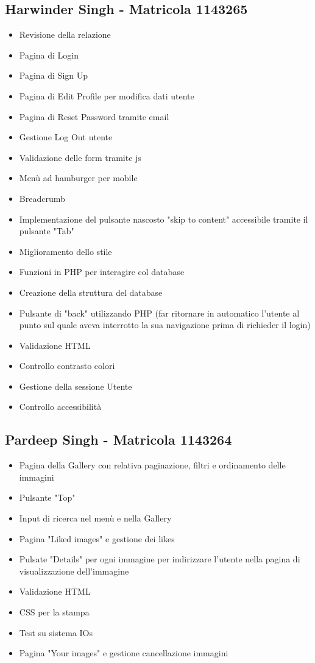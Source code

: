 \documentclass[openany, a4paper, 12pt]{report}
\begin{document}
	\subsection{Harwinder Singh - Matricola 1143265}
	\begin{itemize}
		\item Revisione della relazione
		\item Pagina di Login
		\item Pagina di Sign Up
		\item Pagina di Edit Profile per modifica dati utente
		\item Pagina di Reset Password tramite email
		\item Gestione Log Out utente
		\item Validazione delle form tramite js
		\item Menù ad hamburger per mobile
		\item Breadcrumb
		\item Implementazione del pulsante nascosto "skip to content" accessibile tramite il pulsante "Tab" 
		\item Miglioramento dello stile
		\item Funzioni in PHP per interagire col database
		\item Creazione della struttura del database
		\item Pulsante di "back" utilizzando PHP (far ritornare in automatico l'utente al punto sul quale aveva interrotto la sua navigazione prima di richieder il login)
		\item Validazione HTML
		\item Controllo contrasto colori
		\item Gestione della sessione Utente
		\item Controllo accessibilità
	\end{itemize}
	\subsection{Pardeep Singh - Matricola 1143264}
	\begin{itemize}
		\item Pagina della Gallery con relativa paginazione, filtri e ordinamento delle immagini
		\item Pulsante "Top"
		\item Input di ricerca nel menù e nella Gallery
		\item Pagina "Liked images" e gestione dei likes
		\item Pulsate "Details" per ogni immagine per indirizzare l'utente nella pagina di visualizzazione dell'immagine 
		\item Validazione HTML
		\item CSS per la stampa
		\item Test su sistema IOs
		\item Pagina "Your images" e gestione cancellazione immagini
	\end{itemize}
\end{document}
